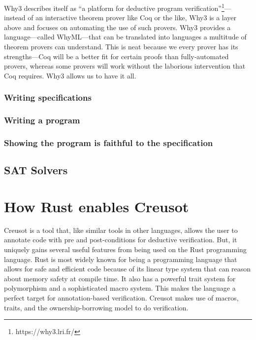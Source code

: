 \documentclass[12pt]{article}
\begin{document}
Why3 describes itself as ``a platform for deductive program verification''\footnote{https://why3.lri.fr/}---instead of an interactive theorem prover like Coq or the like, Why3 is a layer above and focuses on automating the use of such provers.\cite{bobotWhy3ShepherdYour}
Why3 provides a language---called WhyML---that can be translated into languages a multitude of theorem provers can understand.
This is neat because we every prover has its strengths---Coq will be a better fit for certain proofs than fully-automated provers, whereas some provers will work without the laborious intervention that Coq requires.
Why3 allows us to have it all.

\subsubsection{Writing specifications}


\subsubsection{Writing a program}

\subsubsection{Showing the program is faithful to the specification}

\subsection{SAT Solvers}


\section{How Rust enables Creusot}


Creusot is a tool that, like similar tools in other languages, allows the user to annotate code with pre and post-conditions for deductive verification.
But, it uniquely gains several useful features from being used on the Rust programming language. 
Rust is most widely known for being a programming language that allows for safe and efficient code because of its linear type system that can reason about memory safety at compile time. 
It also has a powerful trait system for polymorphism and a sophisticated macro system. 
This makes the language a perfect target for annotation-based verification. 
Creusot makes use of macros, traits, and the ownership-borrowing model to do verification. 
\end{document}
